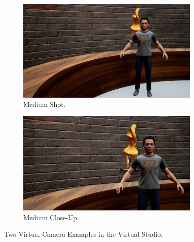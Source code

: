 \documentclass[
  a4paper,  %
  twoside,  %
  bibliography=totoc,
  headsepline,
  cleardoublepage=empty,
  parskip=half,
  draft=false
]{scrbook}
\begin{document}
\begin{figure}[h]
  \centering
  \begin{subfigure}{0.45\textwidth}
    \includegraphics[width=\linewidth]{graphics/unreal-engine/camera angles/medium closeup.png}
    \caption{Medium Shot.}
  \end{subfigure}
  \begin{subfigure}{0.45\textwidth}
    \includegraphics[width=\linewidth]{graphics/unreal-engine/camera angles/close up.png}
    \caption{Medium Close-Up.}
  \end{subfigure}
  \caption{Two Virtual Camera Examples in the Virtual Studio.}
  \label{fig:cameras}
\end{figure}
\end{document}
